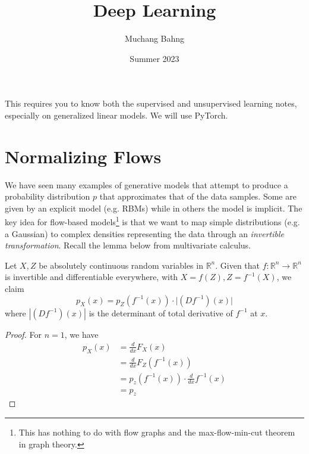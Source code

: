\documentclass{article}
\begin{document}
\title{Deep Learning}
\author{Muchang Bahng}
\date{Summer 2023}

\maketitle
\tableofcontents
\pagebreak 

This requires you to know both the supervised and unsupervised learning notes, especially on generalized linear models. We will use PyTorch.  


 
 


 
 
 
 
 

\section{Normalizing Flows} 

  We have seen many examples of generative models that attempt to produce a probability distribution $p$ that approximates that of the data samples. Some are given by an explicit model (e.g. RBMs) while in others the model is implicit. The key idea for flow-based models\footnote{This has nothing to do with flow graphs and the max-flow-min-cut theorem in graph theory.} is that we want to map simple distributions (e.g. a Gaussian) to complex densities representing the data through an \textit{invertible transformation}. Recall the lemma below from multivariate calculus.  

  \begin{lemma}[Jacobi] 
    Let $X, Z$ be absolutely continuous random variables in $\mathbb{R}^n$. 
    Given that $f: \mathbb{R}^n \rightarrow \mathbb{R}^n$ is invertible and differentiable everywhere, with $X = f(Z), Z = f^{-1} (X)$, we claim 
    \begin{equation}
      p_X (x) = p_Z (f^{-1} (x)) \cdot \big| (D f^{-1}) (x) \big|
    \end{equation} 
    where $|(D f^{-1}) (x)|$ is the determinant of total derivative of $f^{-1}$ at $x$. 
  \end{lemma}
  \begin{proof}
    For $n = 1$, we have 
    \begin{align}
      p_X (x) & = \frac{d}{dx} F_X (x) \\
              & = \frac{d}{dx} F_Z (f^{-1}(x)) \\
              & = p_z (f^{-1} (x)) \cdot \frac{d}{dx} f^{-1} (x)  \\
              & = p_z 
    \end{align}
  \end{proof} 
\end{document}
